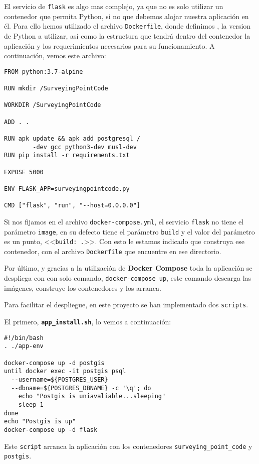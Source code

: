 El servicio de \texttt{flask} es algo mas complejo, ya que no es solo utilizar un contenedor que permita Python, si no que debemos alojar nuestra aplicación en él. Para ello hemos utilizado el archivo \texttt{Dockerfile}, donde definimos , la version de Python a utilizar, así como la estructura que tendrá dentro del contenedor la aplicación y los requerimientos necesarios para su funcionamiento.
A continuación, vemos este archivo:
\newpage
\begin{lstlisting}
FROM python:3.7-alpine

RUN mkdir /SurveyingPointCode

WORKDIR /SurveyingPointCode

ADD . .

RUN apk update && apk add postgresql /
		-dev gcc python3-dev musl-dev
RUN pip install -r requirements.txt
	
EXPOSE 5000

ENV FLASK_APP=surveyingpointcode.py

CMD ["flask", "run", "--host=0.0.0.0"] 
\end{lstlisting}

Si nos fijamos en el archivo \texttt{docker-compose.yml}, el servicio \texttt{flask} no tiene el parámetro \texttt{image}, en su defecto tiene el parámetro  \texttt{build} y el valor del parámetro es un punto, <<\texttt{build: .}>>. Con esto le estamos indicado que construya ese contenedor, con el archivo \texttt{Dockerfile} que encuentre en ese directorio.

Por último, y gracias a la utilización de \textbf{Docker Compose} toda la aplicación se despliega con con solo comando, \texttt{docker-compose up}, este comando descarga las imágenes, construye los contenedores y los arranca.

Para facilitar el despliegue, en este proyecto se han implementado dos \texttt{scripts}.

El primero, \textbf{\texttt{app\_install.sh}}, lo vemos a continuación:
\begin{lstlisting}
#!/bin/bash
. ./app-env

docker-compose up -d postgis
until docker exec -it postgis psql 
  --username=${POSTGRES_USER}
  --dbname=${POSTGRES_DBNAME} -c '\q'; do
	echo "Postgis is uniavaliable...sleeping"
	sleep 1
done
echo "Postgis is up"
docker-compose up -d flask
\end{lstlisting}

Este \texttt{script} arranca la aplicación con los contenedores \texttt{surveying\_point\_code} y \texttt{postgis}.

